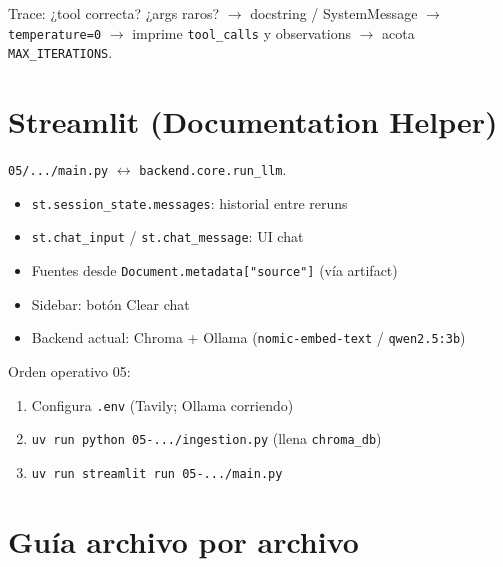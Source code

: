 \documentclass[11pt,a4paper]{article}
\begin{document}
\begin{tip}[title=Depurar un agent]
Trace: ¿tool correcta? ¿args raros? $\to$ docstring / SystemMessage $\to$
\texttt{temperature=0} $\to$ imprime \texttt{tool\_calls} y observations $\to$
acota \texttt{MAX\_ITERATIONS}.
\end{tip}

\section{Streamlit (Documentation Helper)}

\texttt{05/.../main.py} $\leftrightarrow$ \texttt{backend.core.run\_llm}.

\begin{itemize}[leftmargin=*,itemsep=1pt]
  \item \texttt{st.session\_state.messages}: historial entre reruns
  \item \texttt{st.chat\_input} / \texttt{st.chat\_message}: UI chat
  \item Fuentes desde \texttt{Document.metadata["source"]} (vía artifact)
  \item Sidebar: botón Clear chat
  \item Backend actual: Chroma + Ollama (\texttt{nomic-embed-text} / \texttt{qwen2.5:3b})
\end{itemize}

Orden operativo 05:
\begin{enumerate}[leftmargin=*]
  \item Configura \texttt{.env} (Tavily; Ollama corriendo)
  \item \texttt{uv run python 05-.../ingestion.py}  (llena \texttt{chroma\_db})
  \item \texttt{uv run streamlit run 05-.../main.py}
\end{enumerate}

\section{Guía archivo por archivo}
\end{document}
